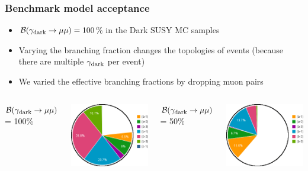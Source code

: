 \documentclass[compress]{beamer}
\newcommand{\s}[1]{{\mbox{\scriptsize #1}}}
\begin{document}
\begin{frame}
\frametitle{Benchmark model acceptance}

\begin{itemize}
\item $\mathcal{B}(\gamma_\s{dark} \to \mu\mu) = 100$\% in the Dark SUSY MC samples
\item Varying the branching fraction changes the topologies of events
  (because there are multiple $\gamma_\s{dark}$ per event)
\item We varied the effective branching fractions by dropping muon
  pairs
\end{itemize}

\vspace{0.3 cm}
\begin{columns}
\centering $\mathcal{B}(\gamma_\s{dark} \to \mu\mu)$ = 100\%

\vspace{0.2 cm}
\includegraphics[width=0.9\linewidth]{chart2d_Br100.png}

\centering $\mathcal{B}(\gamma_\s{dark} \to \mu\mu)$ = 50\%

\vspace{0.2 cm}
\includegraphics[width=0.9\linewidth]{chart2d_Br50.png}


\end{columns}
\end{frame}
\end{document}
